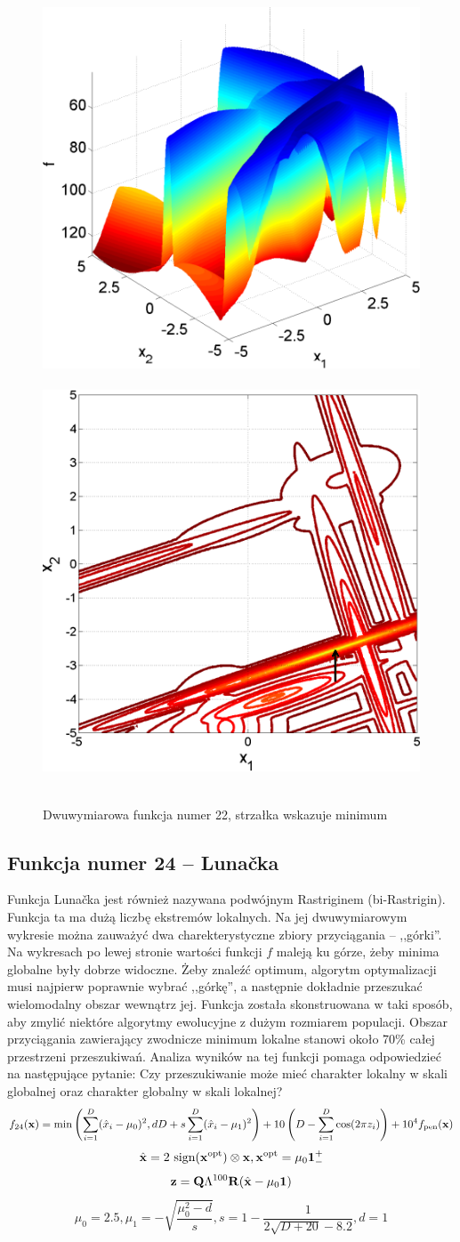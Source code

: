 \documentclass[a4paper,onecolumn,oneside,12pt,wide,floatssmall]{mwrep}
\theoremstyle{definition}
\theoremstyle{plain}%
\theoremstyle{remark}
\begin{document}
\begin{figure}[H]
\centering
\mbox{
\includegraphics[width=.45\textwidth]{img/22.png} \quad
\includegraphics[width=.45\textwidth]{img/22a.png} 
}
\caption{Dwuwymiarowa funkcja numer 22, strzałka wskazuje minimum \cite{noiseless}}
\end{figure}

\subsection{Funkcja numer 24 -- Lunačka}

Funkcja Lunačka jest również nazywana podwójnym Rastriginem (bi-Rastrigin). Funkcja ta ma dużą liczbę ekstremów lokalnych. 
Na jej dwuwymiarowym wykresie można zauważyć dwa charekterystyczne zbiory przyciągania -- ,,górki''. Na wykresach po lewej stronie
wartości funkcji $f$ maleją ku górze, żeby minima globalne były dobrze widoczne.
Żeby znaleźć optimum, algorytm optymalizacji musi najpierw poprawnie wybrać ,,górkę'',
a następnie dokładnie przeszukać wielomodalny obszar wewnątrz jej. Funkcja została skonstruowana w taki sposób, aby zmylić
niektóre algorytmy ewolucyjne z dużym rozmiarem populacji. Obszar przyciągania zawierający zwodnicze
minimum lokalne stanowi około 70\% całej przestrzeni przeszukiwań.
Analiza wyników na tej funkcji pomaga odpowiedzieć na następujące pytanie:
Czy przeszukiwanie może mieć charakter lokalny w skali globalnej oraz charakter globalny w skali lokalnej?
$$ f_{24}(\bold{x}) = \min \left( \sum^D_{i=1}(\hat{x}_i - \mu_0)^2, dD + s \sum^D_{i=1}(\hat{x}_i - \mu_1)^2 \right) + 10 \left( D - \sum^D_{i=1} \cos(2 \pi z_i) \right) + 10^4 f_\text{pen}(\bold{x}) $$
$$ \hat{\bold{x}} = 2 \text{ sign}(\bold{x}^{\text{opt}}) \otimes \bold{x}, \bold{x}^{\text{opt}} = \mu_0 \bold{1}_-^+ $$
$$ \bold{z} = \bold{Q}\Lambda^{100}\bold{R}(\hat{\bold{x}} - \mu_0\bold{1}) $$
$$ \mu_0 = 2.5, \mu_1 = -\sqrt{\frac{\mu_0^2-d}{s}}, s = 1 - \frac{1}{2\sqrt{D+20}-8.2}, d=1 $$
\end{document}
